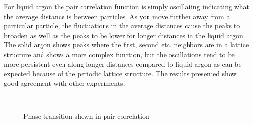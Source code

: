 \documentclass[
10pt, %
a4paper, %
oneside, %
headinclude,footinclude, %
BCOR5mm, %
]{scrartcl}
\begin{document}
For liquid argon the pair correlation function is simply oscillating indicating what the average distance is between  particles. As you move further away from a particular particle, the fluctuations in the average distances cause the peaks to broaden as well as the peaks to be lower for longer distances in the liquid argon. The solid argon shows peaks where the first, second etc. neighbors are in a lattice structure and shows a more complex function, but the oscillations tend to be more persistent even along longer distances compared to liquid argon as can be expected because of the periodic lattice structure. The results presented show good agreement with other experiments\cite{Thijssen:2013cp}. 


\begin{figure}[tb]
\centering
{} \quad
{} \\
 \quad
{}
\caption[Pair correlation function of Argon($\rho = 0.88$, $T=0.6$) ]{Phase transition shown in pair correlation} %
\label{fig:correlation}
\end{figure}

\end{document}
